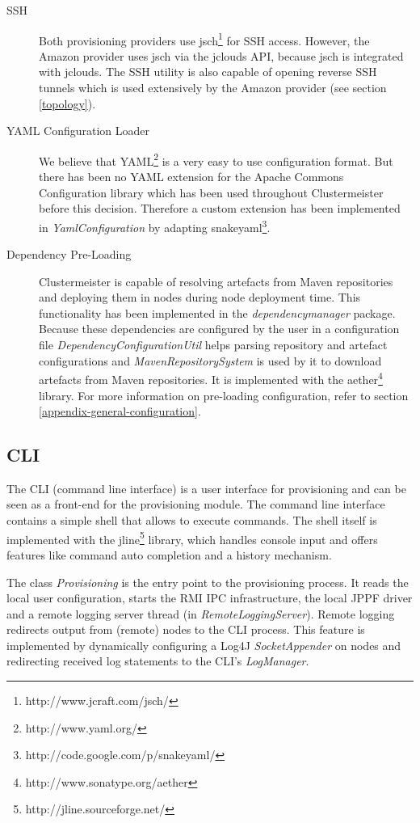 \documentclass[english]{uzhpub}
\begin{document}
\begin{description}
\item[SSH] Both provisioning providers use jsch\footnote{http://www.jcraft.com/jsch/} for SSH access. However, the Amazon provider uses jsch via the jclouds API, because jsch is integrated with jclouds. The SSH utility is also capable of opening reverse SSH tunnels which is used extensively by the Amazon provider (see section \ref{topology}).
\item[YAML Configuration Loader] We believe that YAML\footnote{http://www.yaml.org/} is a very easy to use configuration format. But there has been no YAML extension for the Apache Commons Configuration library which has been used throughout Clustermeister before this decision. Therefore a custom extension has been implemented in \textit{YamlConfiguration} by adapting snakeyaml\footnote{http://code.google.com/p/snakeyaml/}. 
\item[Dependency Pre-Loading] Clustermeister is capable of resolving artefacts from Maven repositories and deploying them in nodes during node deployment time. This functionality has been implemented in the \textit{dependencymanager} package. Because these dependencies are configured by the user in a configuration file \textit{DependencyConfigurationUtil} helps parsing repository and artefact configurations and \textit{MavenRepositorySystem} is used by it to download artefacts from Maven repositories. It is implemented with the aether\footnote{http://www.sonatype.org/aether} library. For more information on pre-loading configuration, refer to section \ref{appendix-general-configuration}.
\end{description}

\subsection{CLI}

The CLI (command line interface) is a user interface for provisioning and can be seen as a front-end for the provisioning module. The command line interface contains a simple shell that allows to execute commands. The shell itself is implemented with the jline\footnote{http://jline.sourceforge.net/} library, which handles console input and offers features like command auto completion and a history mechanism. 

The class \textit{Provisioning} is the entry point to the provisioning process. It reads the local user configuration, starts the RMI IPC infrastructure, the local JPPF driver and a remote logging server thread (in \textit{RemoteLoggingServer}). Remote logging redirects output from (remote) nodes to the CLI process. This feature is implemented by dynamically configuring a Log4J \textit{SocketAppender} on nodes and redirecting received log statements to the CLI's \textit{LogManager}. 
\end{document}
